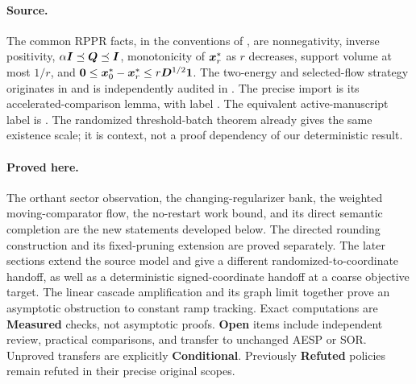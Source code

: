 \documentclass[11pt]{article}
\begin{document}
\paragraph{Source.}
The common RPPR facts, in the conventions of
\citet{fountoulakis2026complexity}, are nonnegativity, inverse positivity,
$\alpha\bm{I}\preceq\bm{Q}\preceq\bm{I}$, monotonicity of $\bm{x}_r^*$ as $r$
decreases, support volume at most $1/r$, and
$\bm{0}\leq\bm{x}_0^*-\bm{x}_r^*\leq r\bm{D}^{1/2}\mathbf{1}$.
The two-energy and selected-flow strategy originates in
 and is independently
audited in . The precise import is its
accelerated-comparison lemma, with label .
The equivalent active-manuscript label is .
The randomized threshold-batch theorem already gives the same existence
scale; it is context, not a proof dependency of our deterministic result.

\paragraph{Proved here.}
The orthant sector observation, the changing-regularizer bank, the weighted
moving-comparator flow, the no-restart work bound, and its direct semantic
completion are the new statements developed below. The directed rounding
construction and its fixed-pruning extension are proved separately.
The later sections extend the source model and give a different
randomized-to-coordinate handoff, as well as a deterministic signed-coordinate
handoff at a coarse objective target. The linear cascade amplification and its
graph limit together prove an asymptotic obstruction to constant ramp tracking.
Exact computations are
\textbf{Measured} checks, not asymptotic proofs. \textbf{Open} items include
independent review, practical comparisons,
and transfer to unchanged AESP or SOR. Unproved transfers are explicitly
\textbf{Conditional}. Previously \textbf{Refuted} policies remain refuted in
their precise original scopes.

















\end{document}
